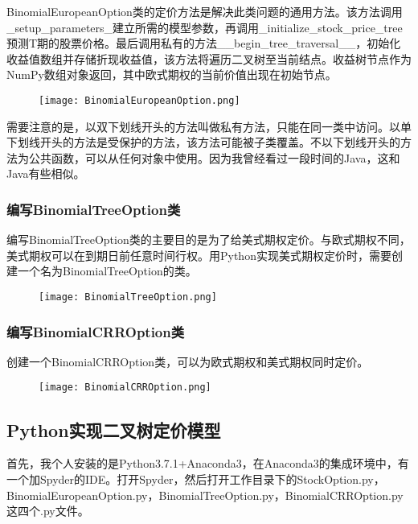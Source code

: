 	BinomialEuropeanOption类的定价方法是解决此类问题的通用方法。该方法调用\_setup\_parameters\_建立所需的模型参数，再调用\_initialize\_stock\_price\_tree预测T期的股票价格。最后调用私有的方法\_\_begin\_tree\_traversal\_\_，初始化收益值数组并存储折现收益值，该方法将遍历二叉树至当前结点。收益树节点作为NumPy数组对象返回，其中欧式期权的当前价值出现在初始节点。
	
	\begin{figure}[htb] %
		\centering
		\texttt{[image: BinomialEuropeanOption.png]}
		\label{fig:xfig1}
	\end{figure}

	需要注意的是，以双下划线开头的方法叫做私有方法，只能在同一类中访问。以单下划线开头的方法是受保护的方法，该方法可能被子类覆盖。不以下划线开头的方法为公共函数，可以从任何对象中使用。因为我曾经看过一段时间的Java，这和Java有些相似。
	
\subsubsection{编写BinomialTreeOption类}
	编写BinomialTreeOption类的主要目的是为了给美式期权定价。与欧式期权不同，美式期权可以在到期日前任意时间行权。用Python实现美式期权定价时，需要创建一个名为BinomialTreeOption的类。
	
	\begin{figure}[htb] %
		\centering
		\texttt{[image: BinomialTreeOption.png]}
		\label{fig:xfig1}
	\end{figure}

\subsubsection{编写BinomialCRROption类}
	创建一个BinomialCRROption类，可以为欧式期权和美式期权同时定价。
	
	\begin{figure}[htb] %
		\centering
		\texttt{[image: BinomialCRROption.png]}
		\label{fig:xfig1}
	\end{figure}



\subsection{Python实现二叉树定价模型}
	首先，我个人安装的是Python3.7.1+Anaconda3，在Anaconda3的集成环境中，有一个加Spyder的IDE。打开Spyder，然后打开工作目录下的StockOption.py，BinomialEuropeanOption.py，BinomialTreeOption.py，BinomialCRROption.py这四个.py文件。
	
